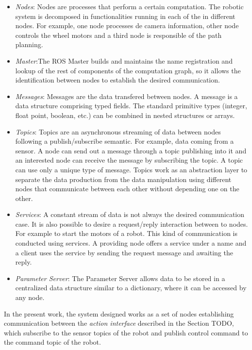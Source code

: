 \begin{itemize}
	\item \emph{Nodes}: Nodes are processes that perform a certain computation. The robotic system is decomposed in functionalities running in each of the in different nodes. For example, one node processes de camera information, other node controls the wheel motors and a third node is responsible of the path planning.
	
	\item \emph{Master}:The ROS Master builds and maintains the name registration and lookup of the rest of components of the computation graph, so it allows the identification between nodes to establish the desired communication.
	
	\item \emph{Messages}: Messages are the data transfered between nodes. A message is a data structure comprising typed fields. The standard primitive types (integer, float point, boolean, etc.) can be combined in nested structures or arrays.
	
	\item \emph{Topics}: Topics are an asynchronous streaming of data between nodes following a publish/subscribe semantic. For example, data coming from a sensor. A node can send out a message through a topic publishing into it and an interested node can receive the message by subscribing the topic. A topic can use only a unique type of message. Topics work as an abstraction layer to separate the data production from the data manipulation using different nodes that communicate between each other without depending one on the other.
	
	\item \emph{Services}: A constant stream of data is not always the desired communication case. It is also possible to desire a request/reply interaction between to nodes. For example to start the motors of a robot. This kind of communication is conducted using services. A providing node offers a service under a name and a client uses the service by sending the request message and awaiting the reply.
	
	\item \emph{Parameter Server}: The Parameter Server allows data to be stored in a centralized data structure similar to a dictionary, where it can be accessed by any node. 
\end{itemize}

In the present work, the system designed works as a set of nodes establishing communication between the \emph{action interface} described in the Section TODO, which subscribe to the sensor topics of the robot and publish control command to the command topic of the robot.

